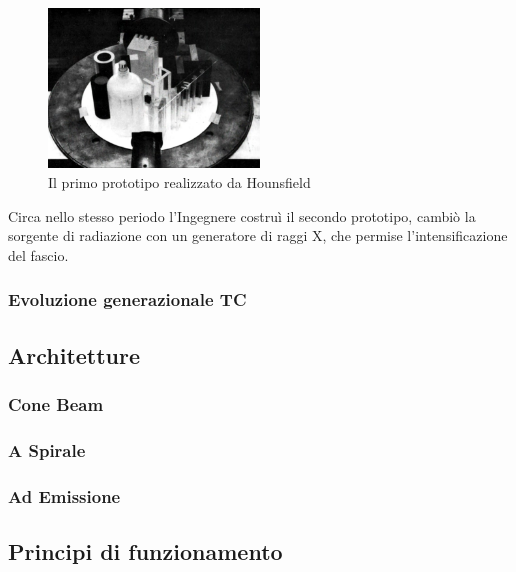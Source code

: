 \documentclass[a4paper,11pt, oneside]{article}
\begin{document}
                         \begin{figure}[h]
                            \centering
                            \includegraphics[width=0.5\textwidth]{first-prototype}
                            \caption{Il primo prototipo realizzato da Hounsfield}
                            \label{fig:prototype}
                        \end{figure}
                        
                        Circa nello stesso periodo l'Ingegnere costruì il secondo prototipo, cambiò la sorgente di radiazione con un generatore di raggi X, che permise l'intensificazione del fascio.
                        
                        
                        
                        
                \subsubsection{Evoluzione generazionale TC}
            
            \subsection{Architetture}
                \subsubsection{Cone Beam}
                \subsubsection{A Spirale}
                \subsubsection{Ad Emissione}
            
            \subsection{Principi di funzionamento}
\end{document}
